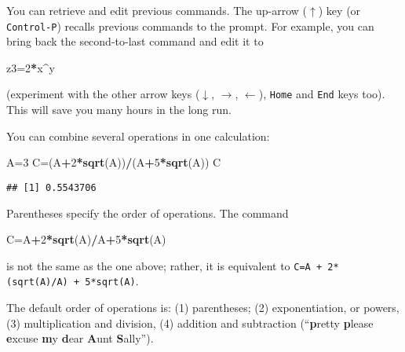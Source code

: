 \documentclass[11pt,]{article}
\newenvironment{Shaded}{\begin{snugshade}}{\end{snugshade}}
\newcommand{\KeywordTok}[1]{\textcolor[rgb]{0.13,0.29,0.53}{\textbf{#1}}}
\newcommand{\DecValTok}[1]{\textcolor[rgb]{0.00,0.00,0.81}{#1}}
\newcommand{\OperatorTok}[1]{\textcolor[rgb]{0.81,0.36,0.00}{\textbf{#1}}}
\newcommand{\NormalTok}[1]{#1}
\begin{document}
You can retrieve and edit previous commands. The up-arrow (\(\uparrow\))
key (or \texttt{Control-P}) recalls previous commands to the prompt. For
example, you can bring back the second-to-last command and edit it to

\begin{Shaded}
\begin{Highlighting}[]
\NormalTok{z3=}\DecValTok{2}\OperatorTok{*}\NormalTok{x}\OperatorTok{^}\NormalTok{y}
\end{Highlighting}
\end{Shaded}

(experiment with the other arrow keys (\(\downarrow\), \(\rightarrow\),
\(\leftarrow\)), \texttt{Home} and \texttt{End} keys too). This will
save you many hours in the long run.

You can combine several operations in one calculation:

\begin{Shaded}
\begin{Highlighting}[]
\NormalTok{A=}\DecValTok{3}
\NormalTok{C=(A}\OperatorTok{+}\DecValTok{2}\OperatorTok{*}\KeywordTok{sqrt}\NormalTok{(A))}\OperatorTok{/}\NormalTok{(A}\OperatorTok{+}\DecValTok{5}\OperatorTok{*}\KeywordTok{sqrt}\NormalTok{(A))}
\NormalTok{C}
\end{Highlighting}
\end{Shaded}

\begin{verbatim}
## [1] 0.5543706
\end{verbatim}

Parentheses specify the order of operations. The command

\begin{Shaded}
\begin{Highlighting}[]
\NormalTok{C=A}\OperatorTok{+}\DecValTok{2}\OperatorTok{*}\KeywordTok{sqrt}\NormalTok{(A)}\OperatorTok{/}\NormalTok{A}\OperatorTok{+}\DecValTok{5}\OperatorTok{*}\KeywordTok{sqrt}\NormalTok{(A)}
\end{Highlighting}
\end{Shaded}

is not the same as the one above; rather, it is equivalent to
\texttt{C=A\ +\ 2*(sqrt(A)/A)\ +\ 5*sqrt(A)}.

The default order of operations is: (1) parentheses; (2) exponentiation,
or powers, (3) multiplication and division, (4) addition and subtraction
(``\textbf{p}retty \textbf{p}lease \textbf{e}xcuse \textbf{m}y
\textbf{d}ear \textbf{A}unt \textbf{S}ally'').
\end{document}
